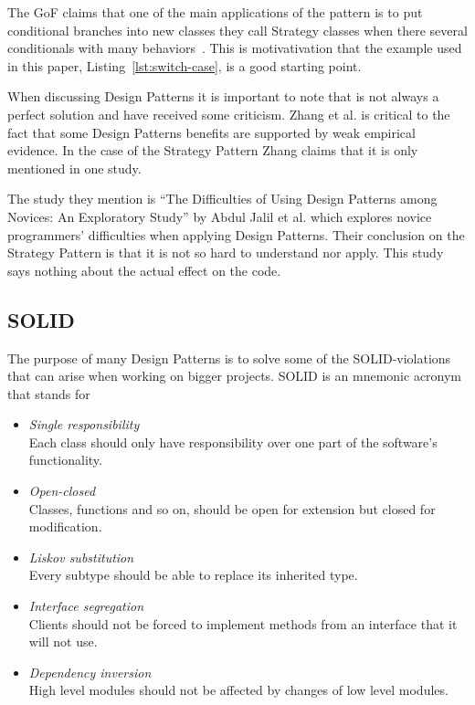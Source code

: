 \documentclass[conference, a4paper]{IEEEtran}
\begin{document}
The GoF claims that one of the main applications of the pattern is to put conditional branches into new classes they call Strategy classes when there several conditionals with many behaviors~\cite{bibitem:GoF}. This is motivativation that the example used in this paper, Listing~\ref{lst:switch-case}, is a good starting point.

When discussing Design Patterns it is important to note that is not always a perfect solution and have received some criticism. Zhang et al. is critical to the fact that some Design Patterns benefits are supported by weak empirical evidence. In the case of the Strategy Pattern Zhang claims that it is only mentioned in one study.~\cite{bibitem:Zhang}

The study they mention is ``The Difficulties of Using Design Patterns among Novices: An Exploratory Study'' by Abdul Jalil et al. which explores novice programmers' difficulties when applying Design Patterns. Their conclusion on the Strategy Pattern is that it is not so hard to understand nor apply. This study says nothing about the actual effect on the code.~\cite{bibitem:Jalil}

\subsection{SOLID}
The purpose of many Design Patterns is to solve some of the SOLID-violations that can arise when working on bigger projects. SOLID is an mnemonic acronym that stands for
\begin{itemize}
    \item \emph{Single responsibility} \\
    Each class should only have responsibility over one part of the software's functionality.
    \item \emph{Open-closed} \\
    Classes, functions and so on, should be open for extension but closed for modification.
    \item \emph{Liskov substitution} \\
    Every subtype should be able to replace its inherited type.
    \item \emph{Interface segregation} \\
    Clients should not be forced to implement methods from an interface that it will not use.
    \item \emph{Dependency inversion} \\
    High level modules should not be affected by changes of low level modules.
\end{itemize}
\end{document}
